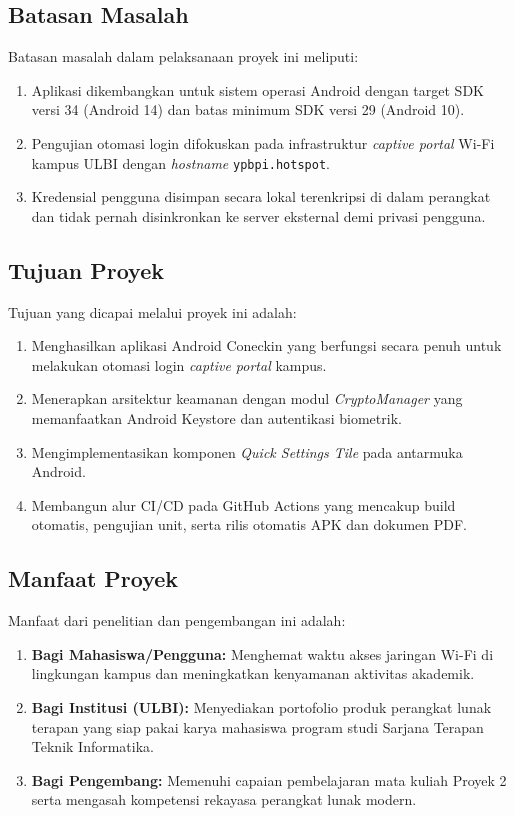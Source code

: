 \subsection{Batasan Masalah}
Batasan masalah dalam pelaksanaan proyek ini meliputi:
\begin{enumerate}
    \item Aplikasi dikembangkan untuk sistem operasi Android dengan target SDK versi 34 (Android 14) dan batas minimum SDK versi 29 (Android 10).
    \item Pengujian otomasi login difokuskan pada infrastruktur \textit{captive portal} Wi-Fi kampus ULBI dengan \textit{hostname} \texttt{ypbpi.hotspot}.
    \item Kredensial pengguna disimpan secara lokal terenkripsi di dalam perangkat dan tidak pernah disinkronkan ke server eksternal demi privasi pengguna.
\end{enumerate}

\subsection{Tujuan Proyek}
Tujuan yang dicapai melalui proyek ini adalah:
\begin{enumerate}
    \item Menghasilkan aplikasi Android Coneckin yang berfungsi secara penuh untuk melakukan otomasi login \textit{captive portal} kampus.
    \item Menerapkan arsitektur keamanan dengan modul \textit{CryptoManager} yang memanfaatkan Android Keystore dan autentikasi biometrik.
    \item Mengimplementasikan komponen \textit{Quick Settings Tile} pada antarmuka Android.
    \item Membangun alur CI/CD pada GitHub Actions yang mencakup build otomatis, pengujian unit, serta rilis otomatis APK dan dokumen PDF.
\end{enumerate}

\subsection{Manfaat Proyek}
Manfaat dari penelitian dan pengembangan ini adalah:
\begin{enumerate}
    \item \textbf{Bagi Mahasiswa/Pengguna:} Menghemat waktu akses jaringan Wi-Fi di lingkungan kampus dan meningkatkan kenyamanan aktivitas akademik.
    \item \textbf{Bagi Institusi (ULBI):} Menyediakan portofolio produk perangkat lunak terapan yang siap pakai karya mahasiswa program studi Sarjana Terapan Teknik Informatika.
    \item \textbf{Bagi Pengembang:} Memenuhi capaian pembelajaran mata kuliah Proyek 2 serta mengasah kompetensi rekayasa perangkat lunak modern.
\end{enumerate}
